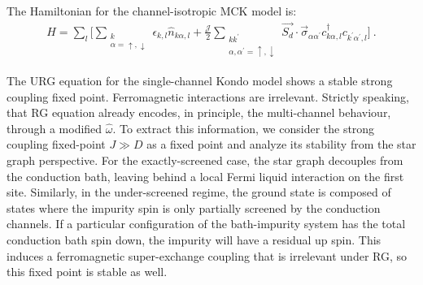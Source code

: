 \documentclass[reprint,onecolumn,prb,superscriptaddress]{revtex4-2}
\begin{document}
The Hamiltonian for the channel-isotropic MCK model is:
\begin{gather}
	H = \sum_l\bigg[\sum_{\substack{k\\\alpha=\uparrow,\downarrow}}\epsilon_{k,l} \hat n_{k\alpha,l} + \frac{\mathcal{J}}{2}\sum_{\substack{kk^\prime\\\alpha,\alpha^\prime= \uparrow,\downarrow}} \vec{S_d}\cdot\vec{\sigma}_{\alpha\alpha^\prime}c_{k\alpha,l}^\dagger c_{k^\prime\alpha^\prime, l}\bigg]~.
\end{gather}

The URG equation for the single-channel Kondo model \cite{kondo_urg} shows a stable strong coupling fixed point. Ferromagnetic interactions are irrelevant. Strictly speaking, that RG equation already encodes, in principle, the multi-channel behaviour, through a modified \(\hat \omega\). To extract this information, we consider the strong coupling fixed-point \(J \gg D\) as a fixed point and analyze its stability from the star graph perspective. For the exactly-screened case, the star graph decouples from the conduction bath, leaving behind a local Fermi liquid interaction on the first site. Similarly, in the under-screened regime, the ground state is composed of states where the impurity spin is only partially screened by the conduction channels. If a particular configuration of the bath-impurity system has the total conduction bath spin down, the impurity will have a residual up spin. This induces a ferromagnetic super-exchange coupling that is irrelevant under RG, so this fixed point is stable as well. 
\end{document}
